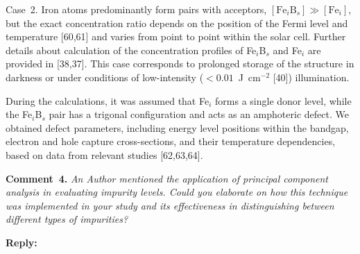 \documentclass[a4paper,fleqn]{cas-sc}
\begin{document}
\begin{mdframed}
Case~2.
Iron atoms predominantly form pairs with acceptors, $\left[\mathrm{Fe}_i\mathrm{B}_s\right] \gg \left[\mathrm{Fe}_i\right]$,
\textcolor[rgb]{1.00,0.07,0.00}{but the exact concentration ratio depends on the position of the Fermi level and temperature} [60,61]
and varies from point to point within the solar cell.
Further details about calculation of the concentration profiles of Fe$_i$B$_s$ and Fe$_i$ are provided in [38,37].
This case corresponds to prolonged storage of the structure in darkness or under conditions of low-intensity ($< 0.01$~J~cm$^{-2}$ [40]) illumination.

During the calculations, it was assumed that Fe$_i$ forms a single donor level,
while the Fe$_i$B$_s$ pair has a trigonal configuration and acts as an amphoteric defect.
\textcolor[rgb]{1.00,0.07,0.00}{We obtained defect parameters, including energy level positions within the bandgap,
electron and hole capture cross-sections, and their temperature dependencies, based on data from relevant studies} [62,63,64].
\end{mdframed}







\vspace{1cm}
\noindent
\textcolor[rgb]{0.00,0.50,1.00}{\textbf{Comment~4.}}
\emph{An Author mentioned the application of principal component analysis in evaluating impurity levels.
Could you elaborate on how this technique was implemented in your study and its effectiveness in distinguishing between different types of impurities?}


\noindent
\textcolor[rgb]{0.51,0.00,0.00}{\textbf{Reply:}}
\end{document}
